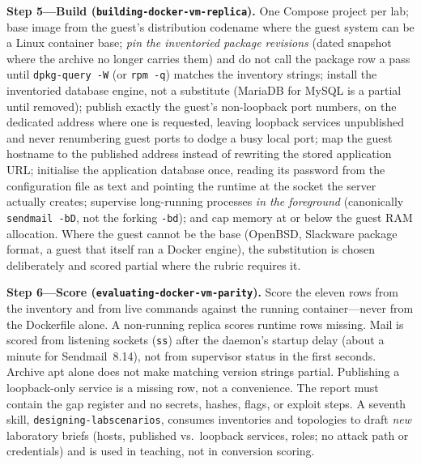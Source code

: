 \documentclass[3p,twocolumn,authoryear]{elsarticle}
\begin{document}
\textbf{Step 5---Build (\texttt{building-\allowbreak docker-\allowbreak vm-\allowbreak replica}).} One
Compose project per lab; base image from the guest's distribution
codename where the guest system can be a Linux container base;
\emph{pin the inventoried package revisions} (dated snapshot where the
archive no longer carries them) and do not call the package row a pass
until \texttt{dpkg-query -W} (or \texttt{rpm -q}) matches the inventory
strings; install the inventoried database engine, not a substitute
(MariaDB for MySQL is a partial until removed); publish exactly the
guest's non-loopback port numbers, on the dedicated address where one
is requested, leaving loopback services unpublished and never
renumbering guest ports to dodge a busy local port; map the guest
hostname to the published address instead of rewriting the stored
application URL; initialise the application database once, reading its
password from the configuration file as text and pointing the runtime
at the socket the server actually creates; supervise long-running
processes \emph{in the foreground} (canonically
\texttt{sendmail -bD}, not the forking \texttt{-bd}); and cap memory at
or below the guest RAM allocation. Where the guest cannot be the base
(OpenBSD, Slackware package format, a guest that itself ran a Docker
engine), the substitution is chosen deliberately and scored partial
where the rubric requires it.

\textbf{Step 6---Score (\texttt{evaluating-\allowbreak docker-\allowbreak vm-\allowbreak parity}).} Score
the eleven rows from the inventory and from live commands against the
running container---never from the Dockerfile alone. A non-running
replica scores runtime rows missing. Mail is scored from listening
sockets (\texttt{ss}) after the daemon's startup delay (about a minute
for Sendmail~8.14), not from supervisor status in the first seconds.
Archive apt alone does not make matching version strings partial.
Publishing a loopback-only service is a missing row, not a convenience.
The report must contain the gap register and no secrets, hashes, flags,
or exploit steps. A seventh skill, \texttt{designing-lab\-scenarios},
consumes inventories and topologies to draft \emph{new} laboratory
briefs (hosts, published vs.\ loopback services, roles; no attack path
or credentials) and is used in teaching, not in conversion scoring.
\end{document}
